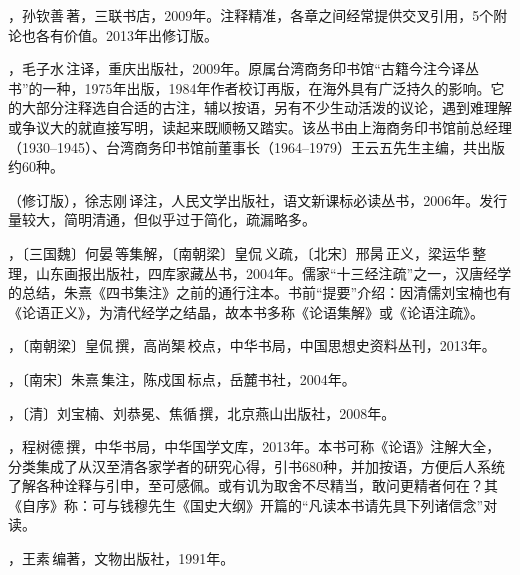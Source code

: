 ，孙钦善\,著，三联书店，2009年。注释精准，各章之间经常提供交叉引用，5个附论也各有价值。2013年出修订版。

，毛子水\,注译，重庆出版社，2009年。原属台湾商务印书馆“古籍今注今译丛书”的一种，1975年出版，1984年作者校订再版，在海外具有广泛持久的影响。它的大部分注释选自合适的古注，辅以按语，另有不少生动活泼的议论，遇到难理解或争议大的就直接写明，读起来既顺畅又踏实。该丛书由上海商务印书馆前总经理（1930--1945）、台湾商务印书馆前董事长（1964--1979）王云五先生主编，共出版约60种。

（修订版），徐志刚\,译注，人民文学出版社，语文新课标必读丛书，2006年。发行量较大，简明清通，但似乎过于简化，疏漏略多。

，〔三国魏〕何晏\,等集解，〔南朝梁〕皇侃\,义疏，〔北宋〕邢昺\,正义，梁运华\,整理，山东画报出版社，四库家藏丛书，2004年。儒家“十三经注疏”之一，汉唐经学的总结，朱熹《四书集注》之前的通行注本。书前“提要”介绍：因清儒刘宝楠也有《论语正义》，为清代经学之结晶，故本书多称《论语集解》或《论语注疏》。

，〔南朝梁〕皇侃\,撰，高尚榘\,校点，中华书局，中国思想史资料丛刊，2013年。

，〔南宋〕朱熹\,集注，陈戍国\,标点，岳麓书社，2004年。

，〔清〕刘宝楠、刘恭冕、焦循\,撰，北京燕山出版社，2008年。

，程树德\,撰，中华书局，中华国学文库，2013年。本书可称《论语》注解大全，分类集成了从汉至清各家学者的研究心得，引书680种，并加按语，方便后人系统了解各种诠释与引申，至可感佩。或有讥为取舍不尽精当，敢问更精者何在？其《自序》称：可与钱穆先生《国史大纲》开篇的“凡读本书请先具下列诸信念”对读。

，王素\,编著，文物出版社，1991年。

